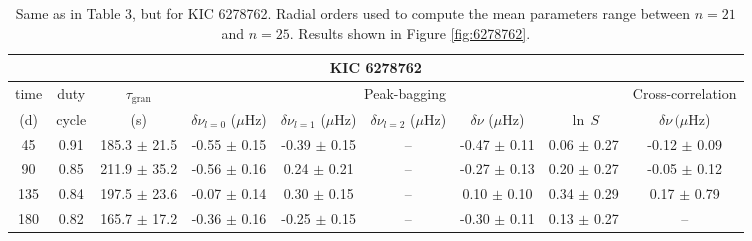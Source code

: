 \documentclass[twocolumn]{aastex61}%
\begin{document}
\begin{table*}[ht]\centering\fontsize{9.}{7.}\selectfont
\begin{tabular}{ccc|ccccc|c}
\multicolumn{9}{c}{KIC 6278762}\\ \hline\hline
time & duty & $\tau_\text{gran}$ &\multicolumn{5}{c|}{Peak-bagging}&Cross-correlation\\
(d)& cycle & (s)&$\delta\nu_{l=0}$ ($\mu$Hz) & $\delta\nu_{l=1}$ ($\mu$Hz) & $\delta\nu_{l=2}$ ($\mu$Hz) & $\delta\nu$ ($\mu$Hz)& $\ln\,S$ & $\delta\nu\,(\mu$Hz)\\\hline
45 & 0.91 & 185.3 $\pm$ 21.5 & -0.55 $\pm$ 0.15 & -0.39 $\pm$ 0.15 & -- & -0.47 $\pm$ 0.11 & 0.06 $\pm$ 0.27 & -0.12 $\pm$ 0.09\\
90 & 0.85 & 211.9 $\pm$ 35.2 & -0.56 $\pm$ 0.16 & 0.24 $\pm$ 0.21 & -- & -0.27 $\pm$ 0.13 & 0.20 $\pm$ 0.27 & -0.05 $\pm$ 0.12\\
135 & 0.84 & 197.5 $\pm$ 23.6 & -0.07 $\pm$ 0.14 & 0.30 $\pm$ 0.15 & -- & 0.10 $\pm$ 0.10 & 0.34 $\pm$ 0.29 & 0.17 $\pm$ 0.79\\
180 & 0.82 & 165.7 $\pm$ 17.2 & -0.36 $\pm$ 0.16 & -0.25 $\pm$ 0.15 & -- & -0.30 $\pm$ 0.11 & 0.13 $\pm$ 0.27 & --\\
\end{tabular}
\caption{Same as in Table 3, but for KIC 6278762. Radial orders used to compute the mean parameters range between $n=21$ and $n=25$. Results shown in Figure \ref{fig:6278762}.}\label{tab:6278762}
\end{table*}
\end{document}
